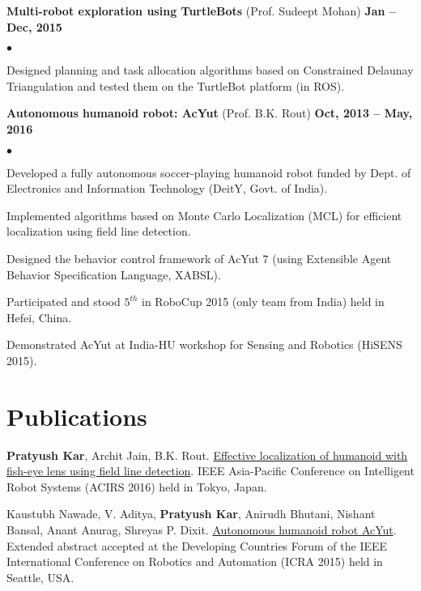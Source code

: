 \documentclass[margin,line]{res}
\newenvironment{list2}{
  \begin{list}{$\bullet$}{%
      \setlength{\itemsep}{0in}
      \setlength{\parsep}{0in} \setlength{\parskip}{0in}
      \setlength{\topsep}{0in} \setlength{\partopsep}{0in} 
      \setlength{\leftmargin}{0.2in}}}{\end{list}}
\begin{document}
\begin{resume}
\begin{minipage}{\linewidth}
{\bf Multi-robot exploration using TurtleBots} (Prof. Sudeept Mohan) \hfill {\bf Jan -- Dec, 2015}

\vspace*{.2cm}
\begin{list2}
\item Designed planning and task allocation algorithms based on Constrained Delaunay Triangulation and tested them on the TurtleBot platform (in ROS).
\end{list2}

\end{minipage}

\begin{minipage}{\linewidth}
{\bf Autonomous humanoid robot: AcYut} (Prof. B.K. Rout) \hfill {\bf Oct, 2013 -- May, 2016}

\vspace*{.2cm}
\begin{list2}
\item Developed a fully autonomous soccer-playing humanoid robot funded by Dept. of Electronics and Information Technology (DeitY, Govt. of India).
\item Implemented algorithms based on Monte Carlo Localization (MCL) for efficient localization using field line detection.
\item Designed the behavior control framework of AcYut 7 (using Extensible Agent Behavior Specification Language, XABSL).
\item Participated and stood $5^{th}$ in RoboCup 2015 (only team from India) held in Hefei, China.
\item Demonstrated AcYut at India-HU workshop for Sensing and Robotics (HiSENS 2015).
\end{list2}

\end{minipage}


\section{\sc Publications}

{\bf Pratyush Kar}, Archit Jain, B.K. Rout. \href{http://dx.doi.org/10.1109/ACIRS.2016.7556191}{Effective localization of humanoid with fish-eye lens using field line detection}. IEEE Asia-Pacific Conference on Intelligent Robot Systems (ACIRS 2016) held in Tokyo, Japan.

Kaustubh Nawade, V. Aditya, {\bf Pratyush Kar}, Anirudh Bhutani, Nishant Bansal, Anant Anurag, Shreyas P. Dixit. \href{https://sites.google.com/site/pratyushkar/publications/Autonomous\%20Humanoid\%20Robot\%20AcYut.pdf?attredirects=0&d=0}{Autonomous humanoid robot AcYut}. Extended abstract accepted at the Developing Countries Forum of the IEEE International Conference on Robotics and Automation (ICRA 2015) held in Seattle, USA.


\end{resume}
\end{document}
